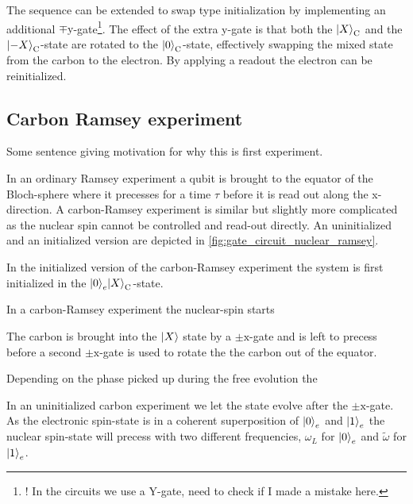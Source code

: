The sequence can be extended to swap type initialization by implementing an additional $\mp{\mathrm{y}}$-gate\footnote{! In the circuits we use a Y-gate, need to check if I made a mistake here.}.
The effect of the extra y-gate is that both the  ${\left\vert{X}\right\rangle}_\mathrm{C} $ and the  ${\left\vert{-X}\right\rangle}_\mathrm{C} $-state are rotated to the  ${\left\vert{0}\right\rangle}_\mathrm{C} $-state, effectively swapping the mixed state from the carbon to the electron.
By applying a readout the electron can be reinitialized.


\subsection{Carbon Ramsey experiment }
Some sentence giving motivation for why this is first experiment.

In an ordinary Ramsey experiment a qubit is brought to the equator of the Bloch-sphere where it precesses for a time $\tau $ before it is read out along the x-direction.
A carbon-Ramsey experiment is similar but slightly more complicated as the nuclear spin cannot be controlled and read-out directly.
An uninitialized and an initialized version are depicted in \cref{fig:gate_circuit_nuclear_ramsey}.

In the initialized version of the carbon-Ramsey experiment the system is first initialized in the ${\left\vert{0}\right\rangle}_e{\left\vert{X}\right\rangle}_\mathrm{C}$-state.


In a carbon-Ramsey experiment the nuclear-spin starts

The carbon is brought into the ${\left\vert{X}\right\rangle}$ state by a $\pm{\mathrm{x}}$-gate and is left to precess before a second $\pm{\mathrm{x}}$-gate is used to rotate the the carbon out of the equator.

Depending on the phase picked up during the free evolution the

In an uninitialized carbon experiment we let the state evolve after the $\pm\mathrm{x}$-gate.
As the electronic spin-state is in a coherent superposition of ${\left\vert{0}\right\rangle}_e$ and ${\left\vert{1}\right\rangle}_e$ the nuclear spin-state will precess with two different frequencies, $\omega_L$ for ${\left\vert{0}\right\rangle}_e$ and $\tilde{\omega}$ for ${\left\vert{1}\right\rangle}_e$.


